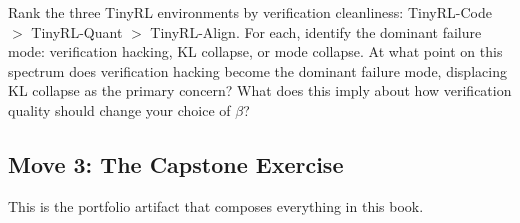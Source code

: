 \begin{thinkfirst}
Rank the three TinyRL environments by verification cleanliness: TinyRL-Code $>$ TinyRL-Quant $>$ TinyRL-Align. For each, identify the dominant failure mode: verification hacking, KL collapse, or mode collapse. At what point on this spectrum does verification hacking become the dominant failure mode, displacing KL collapse as the primary concern? What does this imply about how verification quality should change your choice of $\beta$?
\end{thinkfirst}

\subsection*{Move 3: The Capstone Exercise}

This is the portfolio artifact that composes everything in this book.

